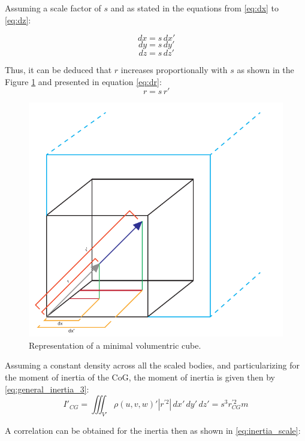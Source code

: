 Assuming a scale factor of $s$ and as stated in the equations from \ref{eq:dx} to \ref{eq:dz}:

\begin{multicols}{3}
  \begin{equation}
  \label{eq:dx}
    \,dx=s \,dx'
  \end{equation}\break
  \begin{equation}
  \label{eq:dy}
    \,dy=s \,dy'
  \end{equation}\break
  \begin{equation}
  \label{eq:dz}
    \,dz=s \,dz'
  \end{equation}\break
\end{multicols}

Thus, it can be deduced that $r$ increases proportionally with $s$ as shown in the Figure \ref{fig:dimensional_analysis} and presented in equation \ref{eq:dr}:
\begin{equation}
  \label{eq:dr}
  \,r=s \,r'
\end{equation}

\begin{figure}[ht!]
  \centering
  \includegraphics[width=0.5\linewidth]{figures/dimensional_analysis.pdf}
  \caption{Representation of a minimal volumentric cube.}
  \label{fig:dimensional_analysis}
\end{figure}

Assuming a constant density across all the scaled bodies, and particularizing for the moment of inertia of the CoG, the moment of inertia is given then by \ref{eq:general_inertia_3}:
\begin{equation}
  \label{eq:general_inertia_3}
  I'_{CG} = \iiint_{V'} \rho(u,v,w)' |r^{'2}| \,dx'\,dy'\,dz' = s^{3} r_{CG}^{'2} m
\end{equation}

A correlation can be obtained for the inertia then as shown in \ref{eq:inertia_scale}:

